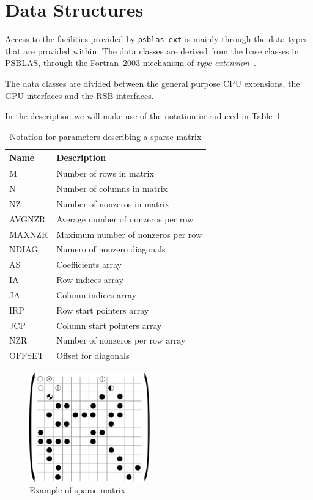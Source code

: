 \section{Data Structures}
\label{sec:datastruct}

Access to the facilities provided by \verb|psblas-ext| is mainly
through the data types that are provided within. 
The data classes are derived from the base  classes in PSBLAS, through 
the Fortran~2003 mechanism of \emph{type extension}~\cite{MRC:11}.  

The data classes are divided between the general purpose CPU
extensions, the GPU interfaces and the RSB interfaces.

In the description we will make use of the notation introduced in
Table~\ref{tab:notation}. 

\begin{table}[ht]
\caption{Notation for parameters describing a sparse matrix}
\begin{center}
{\footnotesize
\begin{tabular}{ll}
\hline
Name & Description \\
\hline
M		& Number of rows in matrix		 \\
N		& Number of columns in matrix		 \\
NZ              & Number of nonzeros in matrix   \\
AVGNZR          & Average number of nonzeros per row  \\
MAXNZR          & Maximum number of nonzeros per row  \\
NDIAG           & Numero of nonzero diagonals\\
AS	        & Coefficients 	array		 \\
IA	        & Row indices array			 \\
JA	        & Column  indices array			 \\
IRP	        & Row start pointers array			 \\
JCP	        & Column start pointers array			 \\
NZR 	        & Number of nonzeros per row array \\
OFFSET          & Offset for diagonals			 \\
\hline
\end{tabular}
}
\end{center}
\label{tab:notation}
\end{table}

\begin{figure}[ht]
	\centering
		\includegraphics[width=5.2cm]{images/mat.pdf}
	\caption{Example of sparse matrix}
	\label{fig:dense}
\end{figure} 


